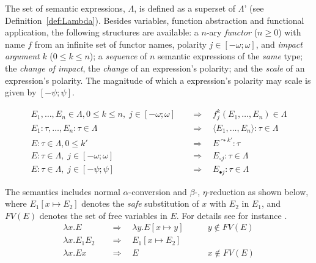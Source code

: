 \begin{definition}
The set of semantic expressions, $\Lambda$, is defined as a superset of $\Lambda$' (see Definition~\ref{def:Lambda}). Besides variables, function abstraction and functional application, the following structures are available: a $n$-ary \emph{functor} ($n \geq 0$) with name $f$ from an infinite set of functor names, polarity $j \in [-\omega;\omega]$, and \emph{impact argument} $k$ ($0 \leq k \leq n$); a \emph{sequence} of $n$ semantic expressions of the \emph{same} type; the \emph{change of impact}, the \emph{change} of an expression's polarity; and the \emph{scale} of an expression's polarity. The magnitude of which a expression's polarity may scale is given by $[-\psi; \psi]$.

\begin{align}
 E_1, \ldots, E_n \in \Lambda, 0 \leq k \leq n, \; j \in [-\omega;\omega]         &\quad \Rightarrow \quad f^k_j(E_1, \ldots, E_n) \in \Lambda \tag{Functor} \\
 E_1 : \tau, \ldots, E_n : \tau \in \Lambda     &\quad \Rightarrow \quad  \langle E_1, \ldots, E_n \rangle  : \tau \in \Lambda \tag{Sequence} \\
 E : \tau \in \Lambda, 0 \leq k' &\quad \Rightarrow \quad E^{\leadsto k'} : \tau \tag{Impact change} \\
 E : \tau \in \Lambda, \; j \in [-\omega;\omega]      &\quad \Rightarrow \quad  E_{\circ
 j}  : \tau \in \Lambda \tag{Change}  \\ 
 E : \tau \in \Lambda, \; j \in [-\psi;\psi]      &\quad \Rightarrow \quad  E_{\bullet j}  : \tau \in \Lambda \tag{Scale} 
\end{align}
\vspace{.3em}

The semantics includes normal $\alpha$-conversion and $\beta$-, $\eta$-reduction as shown below, where $E_1[x \mapsto E_2]$ denotes the \emph{safe} substitution of $x$ with $E_2$ in $E_1$, and $\mathit{FV}(E)$ denotes the set of free variables in $E$. For details see for instance \cite{TODO}.
\begin{align}
 \lambda x . E &\quad \Rightarrow \quad \lambda y . E[x \mapsto y]
 \tag{$\alpha$-conversion} \quad\quad &y \not \in FV(E) \\
 \lambda x . E_1 E_2 &\quad \Rightarrow \quad E_1[x \mapsto E_2]
 \tag{$\beta$-reduction} \\
\lambda x . E x &\quad \Rightarrow \quad E
 \tag{$\eta$-reduction} \quad\quad &x \not \in FV(E) 
\end{align}
\vspace{.3em}


\end{definition}
